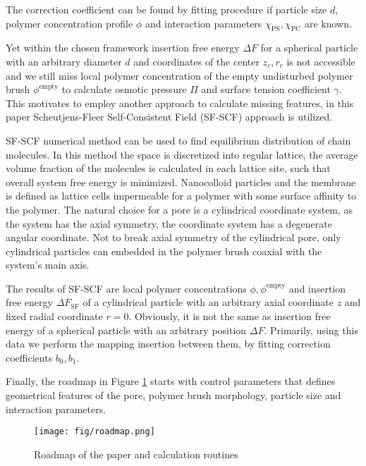 \documentclass[12pt, a4paper]{article}
\begin{document}
The correction coefficient can be found by fitting procedure if particle size $d$, polymer concentration profile $\phi$ and interaction parameters $\chi_{\textrm{PS}}, \chi_{\textrm{PC}}$ are known.

Yet within the chosen framework insertion free energy $\Delta F$ for a spherical particle with an arbitrary diameter $d$ and coordinates of the center $z_c, r_c$ is not accessible and we still miss local polymer concentration of the empty undisturbed polymer brush $\phi^{\textrm{empty}}$ to calculate osmotic pressure $\Pi$ and surface tension coefficient $\gamma$.
This motivates to employ another approach to calculate missing features, in this paper Scheutjens-Fleer Self-Consistent Field (SF-SCF) approach is utilized.

SF-SCF numerical method can be used to find equilibrium distribution of chain molecules.
In this method the space is discretized into regular lattice, the average volume fraction of the molecules is calculated in each lattice site, such that overall system free energy is minimized.
Nanocolloid particles and the membrane is defined as lattice cells impermeable for a polymer with some surface affinity to the polymer.
The natural choice for a pore is a cylindrical coordinate system, as the system has the axial symmetry, the coordinate system has a degenerate angular coordinate.
Not to break axial symmetry of the cylindrical pore, only cylindrical particles can embedded in the polymer brush coaxial with the system's main axis.

The results of SF-SCF are local polymer concentrations $\phi, \phi^{\textrm{empty}}$ and insertion free energy $\Delta F_{\textrm{SF}}$ of a cylindrical particle with an arbitrary axial coordinate $z$ and fixed radial coordinate $r=0$. 
Obviously, it is not the same as insertion free energy of a spherical particle with an arbitrary position $\Delta F$.
Primarily, using this data we perform the mapping insertion between them, by fitting correction coefficients $b_0, b_1$.

Finally, the roadmap in Figure \ref{fig:paper_roadmap} starts with control parameters that defines geometrical features of the pore, polymer brush morphology, particle size and interaction parameters.

\begin{figure}
    \centering
    \texttt{[image: fig/roadmap.png]}
    \caption{
        Roadmap of the paper and calculation routines
        }
    \label{fig:paper_roadmap}
\end{figure}
\end{document}
